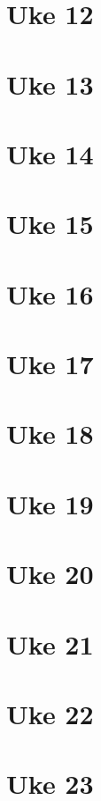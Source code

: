 \documentclass{article}
\begin{document}
  \section{Uke 12}
  \section{Uke 13}
  \section{Uke 14}
  \section{Uke 15}
  \section{Uke 16}
  \section{Uke 17}
  \section{Uke 18}
  \section{Uke 19}
  \section{Uke 20}
  \section{Uke 21}
  \section{Uke 22}
  \section{Uke 23}
\end{document}
